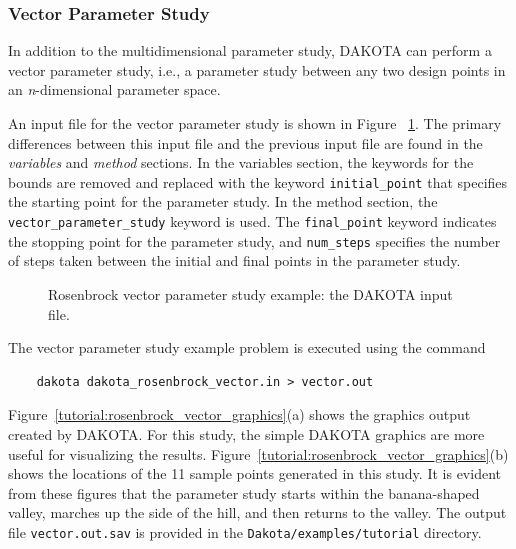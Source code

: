 \subsubsection{Vector Parameter Study}\label{tutorial:example:param_study:vector}

In addition to the multidimensional parameter study, DAKOTA can
perform a vector parameter study, i.e., a parameter study between any
two design points in an \emph{n}-dimensional parameter space.

An input file for the vector parameter study is shown in Figure~
\ref{tutorial:rosenbrock_vector}.  The primary differences
between this input file and the previous input file are found in the
\emph{variables} and \emph{method} sections. In the variables section,
the keywords for the bounds are removed and replaced with the keyword
\texttt{initial\_point} that specifies the starting point for the
parameter study. In the method section, the
\texttt{vector\_parameter\_study} keyword is used. The
\texttt{final\_point} keyword indicates the stopping point for the
parameter study, and \texttt{num\_steps} specifies the number of steps
taken between the initial and final points in the parameter study.

\begin{figure}[ht!]
  \centering
  \begin{bigbox}
    \begin{small}
    \end{small}
  \end{bigbox}
  \caption{Rosenbrock vector parameter study example: the DAKOTA input
  file.}
  \label{tutorial:rosenbrock_vector}
\end{figure}

The vector parameter study example problem is executed using the command
\begin{small}
\begin{verbatim}
    dakota dakota_rosenbrock_vector.in > vector.out
\end{verbatim}
\end{small}

Figure~\ref{tutorial:rosenbrock_vector_graphics}(a) shows the
graphics output created by DAKOTA.  For this study, the simple DAKOTA
graphics are more useful for visualizing the
results. Figure~\ref{tutorial:rosenbrock_vector_graphics}(b)
shows the locations of the 11 sample points generated in this study.
It is evident from these figures that the parameter study starts
within the banana-shaped valley, marches up the side of the hill, and
then returns to the valley. The output file \texttt{vector.out.sav} is
provided in the \texttt{Dakota/examples/tutorial} directory.

